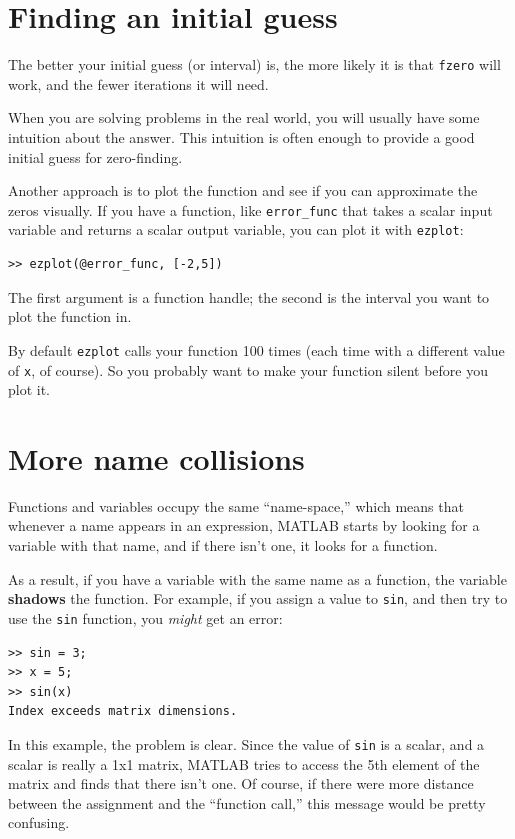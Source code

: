 \documentclass[
]{book}
\begin{document}
\section{Finding an initial guess}

The better your initial guess (or interval) is, the more likely
it is that {\tt fzero} will work, and the fewer iterations it will
need.

When you are solving problems in the real world, you will usually
have some intuition about the answer.  This intuition is often enough
to provide a good initial guess for zero-finding.

Another approach is to plot the function and see if you can
approximate the zeros visually.  If you have a function, like
{\tt error\_func} that takes a scalar input variable and returns
a scalar output variable, you can plot it with {\tt ezplot}:

\begin{verbatim}
>> ezplot(@error_func, [-2,5])
\end{verbatim}

The first argument is a function handle; the second is the
interval you want to plot the function in.

By default {\tt ezplot} calls your function 100 times (each time
with a different value of {\tt x}, of course).  So you probably want
to make your function silent before you plot it.

\section{More name collisions}

Functions and variables occupy the same ``name-space,'' which means
that whenever a name appears in an expression, MATLAB starts by looking
for a variable with that name, and if there isn't one, it looks for
a function.

As a result, if you have a variable with the same name as a function,
the variable {\bf shadows} the function.  For example, if you assign
a value to {\tt sin}, and then try to use the {\tt sin} function, you
{\em might} get an error:

\begin{verbatim}
>> sin = 3;
>> x = 5;
>> sin(x)
Index exceeds matrix dimensions.
\end{verbatim}

In this example, the problem is clear.  Since the value of {\tt sin}
is a scalar, and a scalar is really a 1x1 matrix, MATLAB tries to
access the 5th element of the matrix and finds that there isn't one.
Of course, if there were more distance between the assignment
and the ``function call,'' this message would be pretty confusing.
\end{document}

